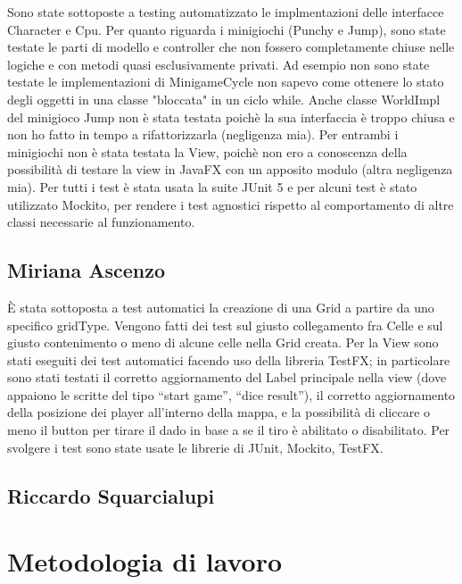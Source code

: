 \documentclass[a4paper,12pt]{report}
\begin{document}
    Sono state sottoposte a testing automatizzato le implmentazioni delle interfacce Character e Cpu.
    Per quanto riguarda i minigiochi (Punchy e Jump), sono state testate le parti di modello e controller che
    non fossero completamente chiuse nelle logiche e con metodi quasi esclusivamente privati.\newline
    Ad esempio non sono state testate le implementazioni di MinigameCycle non sapevo come ottenere lo stato degli oggetti
    in una classe "bloccata" in un ciclo while.\newline
    Anche classe WorldImpl del minigioco Jump non è stata testata poichè la sua interfaccia è troppo chiusa e non ho fatto in tempo a
    rifattorizzarla (negligenza mia).\newline
    Per entrambi i minigiochi non è stata testata la View, poichè non ero a conoscenza della possibilità di testare la view in JavaFX con
    un apposito modulo (altra negligenza mia).\newline
    \newline
    Per tutti i test è stata usata la suite JUnit 5 e per alcuni test è stato utilizzato Mockito, per rendere i test agnostici
    rispetto al comportamento di altre classi necessarie al funzionamento.

	\subsection{Miriana Ascenzo}

	È stata sottoposta a test automatici la creazione di una Grid a partire da uno specifico gridType.
	Vengono fatti dei test sul giusto collegamento fra Celle e sul giusto contenimento o meno di alcune celle nella Grid creata.
	Per la View sono stati eseguiti dei test automatici facendo uso della libreria TestFX; in particolare sono stati testati il corretto aggiornamento del Label principale nella view (dove appaiono le scritte del tipo “start game”, “dice result”),
	il corretto aggiornamento della posizione dei player all'interno della mappa, e la possibilità di cliccare o meno il button per tirare il dado in base a se il tiro è abilitato o disabilitato.
    Per svolgere i test sono state usate le librerie di JUnit, Mockito, TestFX.


	\subsection{Riccardo Squarcialupi}

	\section{Metodologia di lavoro}
\end{document}
